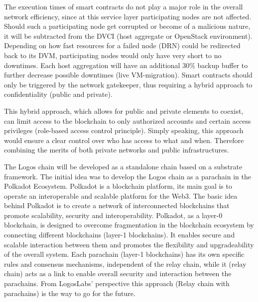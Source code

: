 \documentclass[]{article}
\begin{document}
The execution times of smart contracts do not play a major role in the overall network efficiency, since at this service layer participating nodes are not affected.
Should such a participating node get corrupted or become of a malicious nature, it will be subtracted from the DVCI (host aggregate or OpenStack environment).
Depending on how fast resources for a failed node (DRN) could be redirected back to its DVM, participating nodes would only have very short to no downtimes. 
Each host aggregation will have an additional 30\% backup buffer to further decrease possible downtimes (live VM-migration).
Smart contracts should only be triggered by the network gatekeeper, thus requiring a hybrid approach to confidentiality (public and private).

This hybrid approach, which allows for public and private elements to coexist, can limit access to the blockchain to only authorized accounts and certain access privileges (role-based access control principle).
Simply speaking, this approach would ensure a clear control over who has access to what and when.
Therefore combining the merits of both private networks and public infrastructures.

The Logos chain will be developed as a standalone chain based on a substrate framework.
The initial idea was to develop the Logos chain as a parachain in the Polkadot Ecosystem.
Polkadot is a blockchain platform, its main goal is to operate an interoperable and scalable platform for the Web3.
The basic idea behind Polkadot is to create a network of interconnected blockchains that promote scalability, security and interoperability.
Polkadot, as a layer-0 blockchain, is designed to overcome fragmentation in the blockchain ecosystem by connecting different blockchains (layer-1 blockchains). 
It enables secure and scalable interaction between them and promotes the flexibility and upgradeability of the overall system.
Each parachain \cite{PolkadotDoc-parachain} (layer-1 blockchains) has its own specific rules and consensus mechanisms, independent of the relay chain, while it (relay chain) acts as a link to enable overall security and interaction between the parachains.
From LogosLabs' perspective this approach (Relay chain with parachains) is the way to go for the future.
\end{document}
